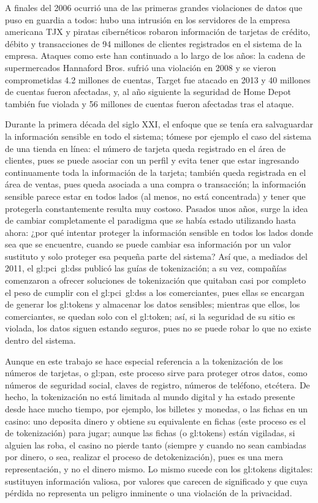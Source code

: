 A finales del 2006 ocurrió una de las primeras grandes violaciones de datos
que puso en guardia a todos: hubo una intrusión en los servidores de la empresa
americana TJX y piratas cibernéticos robaron información de tarjetas de crédito,
débito y transacciones de 94 millones de clientes registrados en el sistema de
la empresa. Ataques como este han continuado a lo largo de los años: la cadena
de supermercados Hannaford Bros. sufrió una violación en 2008 y se vieron
comprometidas 4.2 millones de cuentas, Target fue atacado en 2013 y 40 millones
de cuentas fueron afectadas, y, al año siguiente la seguridad de Home Depot
también fue violada y 56 millones de cuentas fueron afectadas tras el ataque.

Durante la primera década del siglo XXI, el enfoque que se tenía era
salvaguardar la información sensible en todo el sistema; tómese por ejemplo el
caso del sistema de una tienda en línea: el número de tarjeta queda registrado
en el área de clientes, pues se puede asociar con un perfil y evita tener que
estar ingresando continuamente toda la información de la tarjeta; también queda
registrada en el área de ventas, pues queda asociada a una compra o transacción;
la información sensible parece estar en todos lados (al menos, no está
concentrada) y tener que protegerla constantemente resulta muy costoso. Pasados
unos años, surge la idea de cambiar completamente el paradigma que se había
estado utilizando hasta ahora: ¿por qué intentar proteger la información
sensible en todos los lados donde sea que se encuentre, cuando se puede cambiar
esa información por un valor sustituto y solo proteger esa pequeña parte del
sistema? Así que, a mediados del 2011, el \gls{gl:pci}~\gls{gl:dss} publicó
las guías de tokenización; a su vez, compañías comenzaron a ofrecer soluciones
de tokenización que quitaban casi por completo el peso de cumplir con el
\gls{gl:pci}~\gls{gl:dss} a los comerciantes, pues ellas se encargan de generar
los \glspl{gl:token} y almacenar los datos sensibles; mientras que ellos,
los comerciantes, se quedan solo con el \gls{gl:token}; así, si la seguridad de
su sitio es violada, los datos siguen estando seguros, pues no se puede robar
lo que no existe dentro del sistema.

Aunque en este trabajo se hace especial referencia a la tokenización de los
números de tarjetas, o \gls{gl:pan}, este proceso sirve para proteger otros
datos, como números de seguridad social, claves de registro, números de
teléfono, etcétera. De hecho, la tokenización no está limitada al mundo digital
y ha estado presente desde hace mucho tiempo, por ejemplo, los billetes y
monedas, o las fichas en un casino: uno deposita dinero y obtiene su
equivalente en fichas (este proceso es el de tokenización) para jugar; aunque
las fichas (o \glspl{gl:token}) están vigiladas, si alguien las roba, el casino
no pierde tanto (siempre y cuando no sean cambiadas por dinero, o sea, realizar
el proceso de detokenización), pues es una mera representación, y no el dinero
mismo. Lo mismo sucede con los \glspl{gl:token} digitales: sustituyen
información valiosa, por valores que carecen de significado y que cuya pérdida
no representa un peligro inminente o una violación de la privacidad.

